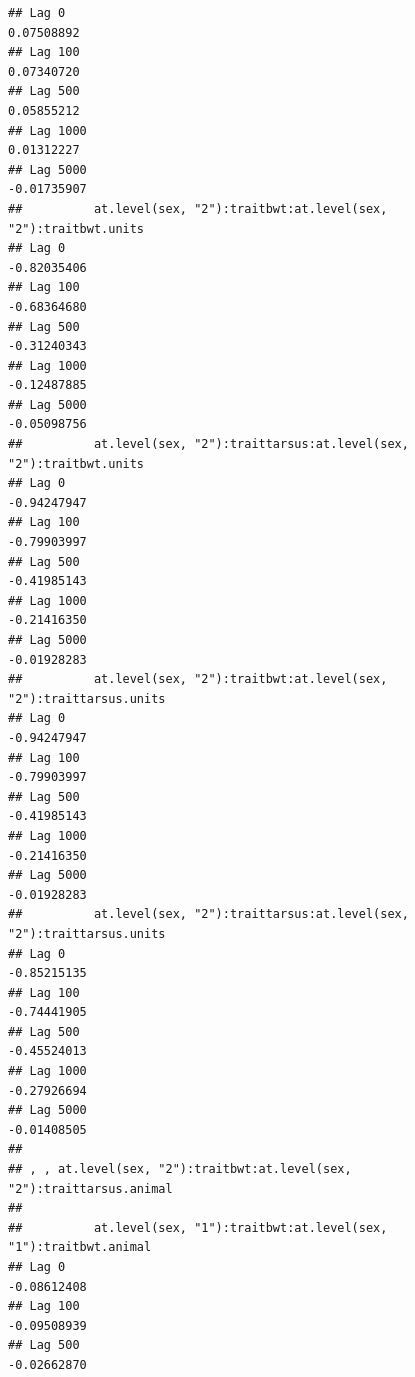 \documentclass[
  12pt,
]{book}
\begin{document}
\begin{verbatim}
## Lag 0                                                             0.07508892
## Lag 100                                                           0.07340720
## Lag 500                                                           0.05855212
## Lag 1000                                                          0.01312227
## Lag 5000                                                         -0.01735907
##          at.level(sex, "2"):traitbwt:at.level(sex, "2"):traitbwt.units
## Lag 0                                                      -0.82035406
## Lag 100                                                    -0.68364680
## Lag 500                                                    -0.31240343
## Lag 1000                                                   -0.12487885
## Lag 5000                                                   -0.05098756
##          at.level(sex, "2"):traittarsus:at.level(sex, "2"):traitbwt.units
## Lag 0                                                         -0.94247947
## Lag 100                                                       -0.79903997
## Lag 500                                                       -0.41985143
## Lag 1000                                                      -0.21416350
## Lag 5000                                                      -0.01928283
##          at.level(sex, "2"):traitbwt:at.level(sex, "2"):traittarsus.units
## Lag 0                                                         -0.94247947
## Lag 100                                                       -0.79903997
## Lag 500                                                       -0.41985143
## Lag 1000                                                      -0.21416350
## Lag 5000                                                      -0.01928283
##          at.level(sex, "2"):traittarsus:at.level(sex, "2"):traittarsus.units
## Lag 0                                                            -0.85215135
## Lag 100                                                          -0.74441905
## Lag 500                                                          -0.45524013
## Lag 1000                                                         -0.27926694
## Lag 5000                                                         -0.01408505
## 
## , , at.level(sex, "2"):traitbwt:at.level(sex, "2"):traittarsus.animal
## 
##          at.level(sex, "1"):traitbwt:at.level(sex, "1"):traitbwt.animal
## Lag 0                                                       -0.08612408
## Lag 100                                                     -0.09508939
## Lag 500                                                     -0.02662870

\end{verbatim}
\end{document}
